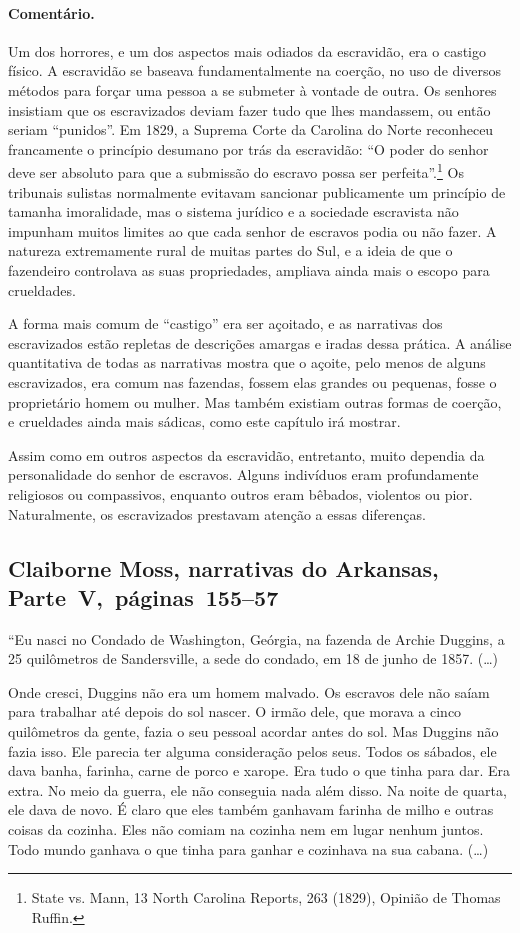 \paragraph{Comentário.}\quad
{\small
Um dos horrores, e um dos aspectos mais odiados da escravidão, era
o castigo físico. A escravidão se baseava fundamentalmente na coerção,
no uso de diversos métodos para forçar uma pessoa a se submeter à
vontade de outra. Os senhores insistiam que os escravizados deviam fazer
tudo que lhes mandassem, ou então seriam ``punidos''. Em 1829, a Suprema
Corte da Carolina do Norte reconheceu francamente o princípio desumano
por trás da escravidão: ``O poder do senhor deve ser absoluto para que a
submissão do escravo possa ser perfeita''.\footnote{State vs. Mann, 13
  North Carolina Reports, 263 (1829), Opinião de Thomas Ruffin.}
Os tribunais sulistas normalmente evitavam sancionar publicamente
um princípio de tamanha imoralidade, mas o sistema jurídico e a
sociedade escravista não impunham muitos limites ao que cada senhor de
escravos podia ou não fazer. A natureza extremamente rural de muitas
partes do Sul, e a ideia de que o fazendeiro controlava as suas
propriedades, ampliava ainda mais o escopo para crueldades.

A forma mais comum de ``castigo'' era ser açoitado, e as
narrativas dos escravizados estão repletas de descrições amargas e iradas
dessa prática. A análise quantitativa de todas as narrativas mostra que
o açoite, pelo menos de alguns escravizados, era comum nas fazendas, fossem
elas grandes ou pequenas, fosse o proprietário homem ou mulher. Mas
também existiam outras formas de coerção, e crueldades ainda mais
sádicas, como este capítulo irá mostrar.

Assim como em outros aspectos da escravidão, entretanto, muito
dependia da personalidade do senhor de escravos. Alguns indivíduos eram
profundamente religiosos ou compassivos, enquanto outros eram bêbados,
violentos ou pior. Naturalmente, os escravizados prestavam atenção a essas
diferenças.
}

\subsection{Claiborne Moss, narrativas do Arkansas, Parte~V,~páginas~155--57}
\label{ref203}

``Eu nasci no Condado de Washington, Geórgia, na fazenda de Archie
Duggins, a 25 quilômetros de Sandersville, a sede do condado, em 18 de
junho de 1857. (\ldots{})

Onde cresci, Duggins não era um homem malvado. Os escravos dele não
saíam para trabalhar até depois do sol nascer. O irmão dele, que morava
a cinco quilômetros da gente, fazia o seu pessoal acordar antes do sol.
Mas Duggins não fazia isso. Ele parecia ter alguma consideração pelos
seus. Todos os sábados, ele dava banha, farinha, carne de porco e
xarope. Era tudo o que tinha para dar. Era extra. No meio da guerra, ele
não conseguia nada além disso. Na noite de quarta, ele dava de novo. É
claro que eles também ganhavam farinha de milho e outras coisas da
cozinha. Eles não comiam na cozinha nem em lugar nenhum juntos. Todo
mundo ganhava o que tinha para ganhar e cozinhava na sua cabana.
(\ldots{})

